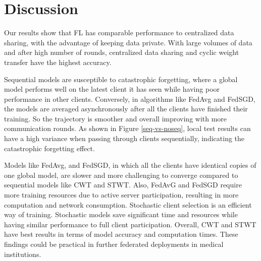 
\section{Discussion}
\label{sec:discussion}






% 
Our results show that FL has comparable performance to centralized data sharing, with the advantage of keeping data private. With large volumes of data and after high number of rounds, centralized data sharing and cyclic weight transfer have the highest accuracy. 


Sequential models are susceptible to catastrophic forgetting, where a global model performs well on the latest client it has seen while having poor performance in other clients.
Conversely, in algorithms like FedAvg and FedSGD, the models are averaged asynchronously after all the clients have finished their training. So the trajectory is smoother and overall improving with more communication rounds. As shown in Figure \ref{seq-vs-noseq}, local test results can have a high variance when passing through clients sequentially, indicating the catastrophic forgetting effect.

Models like FedAvg, and FedSGD, in which all the clients have identical copies of one global model, are slower and more challenging to converge compared to sequential models like CWT and STWT. Also, FedAvG and FedSGD require more training resources due to active server participation, resulting in more computation and network consumption. Stochastic client selection is an efficient way of training. Stochastic models save significant time and resources while having similar performance to full client participation. Overall, CWT and STWT have best results in terms of model accuracy and computation times. These findings could be practical in further federated deployments in medical institutions.




